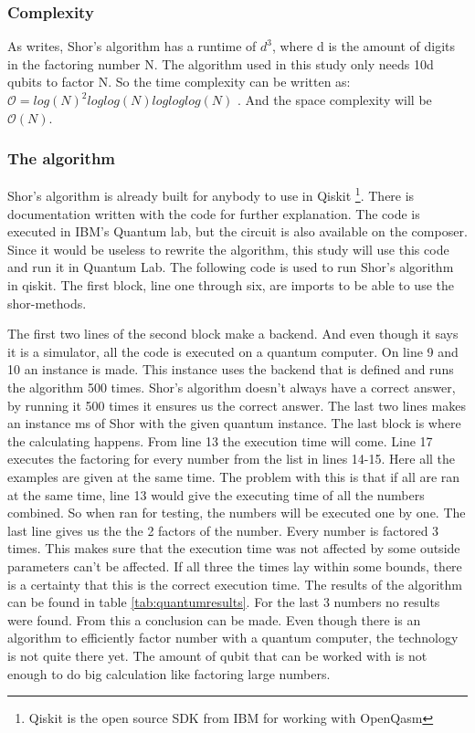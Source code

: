 \subsubsection{Complexity}
As \textcite{shor_algo} writes, Shor's algorithm has a runtime of $d^3$, where d is the amount of digits in the factoring number N. The algorithm used in this study only needs 10d qubits to factor N.
So the time complexity can be written as: $\mathcal{O} = log(N)^2log log(N) log log log(N)$ \autocite{shor_comp}. And the space complexity will be $\mathcal{O}(N)$.
\subsubsection{The algorithm}
Shor's algorithm is already built for anybody to use in Qiskit \footnote{Qiskit is the open source SDK from IBM for working with OpenQasm}. There is documentation written with the code for further explanation.
The code is executed in IBM's Quantum lab, but the circuit is also available on the composer. Since it would be useless to rewrite the algorithm, this study will use this code and run it in Quantum Lab.
The following code is used to run Shor's algorithm in qiskit. The first block, line one through six, are imports to be able to use the shor-methods.

The first two lines of the second block make a backend. And even though it says it is a simulator, all the code is executed on a quantum computer.
On line 9 and 10 an instance is made. This instance uses the backend that is defined and runs the algorithm 500 times. Shor's algorithm doesn't always have a correct answer, by running it 500 times it ensures us the correct answer.
The last two lines makes an instance ms of Shor with the given quantum instance.
The last block is where the calculating happens.
From line 13 the execution time will come.
Line 17 executes the factoring for every number from the list in lines 14-15. Here all the examples are given at the same time. The problem with this is that if all are ran at the same time, line 13 would give the executing time of all the numbers combined.
So when ran for testing, the numbers will be executed one by one.
The last line gives us the the 2 factors of the number.
Every number is factored 3 times. This makes sure that the execution time was not affected by some outside parameters can't be affected. If all three the times lay within some bounds, there is a certainty that this is the correct execution time.
The results of the algorithm can be found in table \ref{tab:quantumresults}. For the last 3 numbers no results were found. 
From this a conclusion can be made. Even though there is an algorithm to efficiently factor number with a quantum computer, the technology is not quite there yet.
The amount of qubit that can be worked with is not enough to do big calculation like factoring large numbers.


